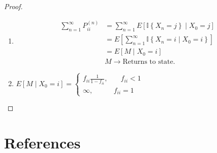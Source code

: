 \documentclass{article}
\theoremstyle{remark}
\begin{document}
 \begin{proof}
   \begin{enumerate}[label=(\roman*)]
     \item  \[
         \begin{split}
\sum_{n =1}^{\infty}  P _{ii}^{(n)}  & = \sum_{n= 1}^{\infty}  E\left[ \mathbb{I} \left\{ X_{n} = j \right\}  \mid  X_{0} = j \right]  \\
       & = E\left[ \sum_{n=1}^{ \infty}  \mathbb{I} \left\{ X_{n} = i  \mid  X_{0} = i \right\} \right] \\
       &= E\left[ M  \mid  X_{0} = i \right] \\
        & M \to  \text{Returns to state.}
         \end{split} 
     \] 
   \item $E \left[ M  \mid  X_{0} = i \right] = \begin{cases}
     f_{ii}\frac{1}{1- f_{ii}}  , &  \quad  f_{ii} < 1 \\
     \infty ,  &  f_{ii} = 1 
   \end{cases}$
   \end{enumerate}
 \end{proof}

\section{References}
\label{sec:references}





\end{document}
